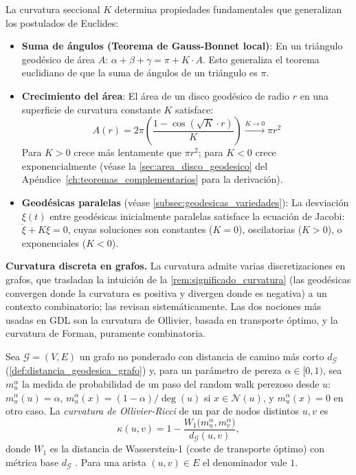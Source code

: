 \begin{remark}\label{rem:significado_curvatura}
La curvatura seccional $K$ determina propiedades fundamentales que generalizan los postulados de Euclides:
\begin{itemize}
    \item \textbf{Suma de ángulos (Teorema de Gauss-Bonnet local)}: En un triángulo geodésico
          de área $A$: $\alpha + \beta + \gamma = \pi + K \cdot A$. Esto generaliza el
          teorema euclidiano de que la suma de ángulos de un triángulo es $\pi$.
    \item \textbf{Crecimiento del área}: El área de un disco geodésico de radio $r$ en una superficie de curvatura constante $K$ satisface:
          \[
          A(r) = 2\pi \left( \frac{1 - \cos(\sqrt{K} \cdot r)}{K} \right) \xrightarrow{K \to 0} \pi r^2
          \]
          Para $K > 0$ crece más lentamente que $\pi r^2$; para $K < 0$ crece exponencialmente (véase la \autoref{sec:area_disco_geodesico} del Apéndice~\ref{ch:teoremas_complementarios} para la derivación).
    \item \textbf{Geodésicas paralelas} (véase \autoref{subsec:geodesicas_variedades}):
          La desviación $\xi(t)$ entre geodésicas inicialmente paralelas satisface la
          ecuación de Jacobi: $\ddot{\xi} + K\xi = 0$, cuyas soluciones son constantes ($K=0$),
          oscilatorias ($K>0$), o exponenciales ($K<0$).
\end{itemize}
\end{remark}

\textbf{Curvatura discreta en grafos.} La curvatura admite varias discretizaciones en grafos, que trasladan la intuición de la \autoref{rem:significado_curvatura} (las geodésicas convergen donde la curvatura es positiva y divergen donde es negativa) a un contexto combinatorio; \citet{yadav2025curvatureroadmap} las revisan sistemáticamente. Las dos nociones más usadas en \gls{GDL} son la curvatura de Ollivier, basada en transporte óptimo, y la curvatura de Forman, puramente combinatoria.

\begin{definition}\label{def:curvatura_ollivier}
Sea $\mathcal{G} = (V, E)$ un grafo no ponderado con distancia de camino más corto $d_{\mathcal{G}}$ (\autoref{def:distancia_geodesica_grafo}) y, para un parámetro de pereza $\alpha \in [0,1)$, sea $m_u^{\alpha}$ la medida de probabilidad de un paso del random walk perezoso desde $u$: $m_u^{\alpha}(u) = \alpha$, $m_u^{\alpha}(x) = (1-\alpha)/\deg(u)$ si $x \in \mathcal{N}(u)$, y $m_u^{\alpha}(x) = 0$ en otro caso. La \textit{curvatura de Ollivier-Ricci} de un par de nodos distintos $u, v$ es
\[
\kappa(u,v) = 1 - \frac{W_1\bigl(m_u^{\alpha}, m_v^{\alpha}\bigr)}{d_{\mathcal{G}}(u,v)},
\]
donde $W_1$ es la distancia de Wasserstein-1 (coste de transporte óptimo) con métrica base $d_{\mathcal{G}}$ \citep{ollivier2009ricci}. Para una arista $(u,v) \in E$ el denominador vale $1$.
\end{definition}

